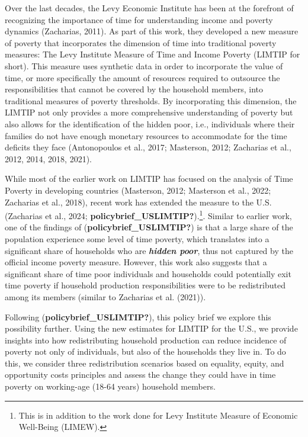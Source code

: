 \documentclass[
  11pt,
]{article}
\begin{document}
Over the last decades, the Levy Economic Institute has been at the
forefront of recognizing the importance of time for understanding income
and poverty dynamics (Zacharias, 2011). As part of this work, they
developed a new measure of poverty that incorporates the dimension of
time into traditional poverty measures: The Levy Institute Measure of
Time and Income Poverty (LIMTIP for short). This measure uses synthetic
data in order to incorporate the value of time, or more specifically the
amount of resources required to outsource the responsibilities that
cannot be covered by the household members, into traditional measures of
poverty thresholds. By incorporating this dimension, the LIMTIP not only
provides a more comprehensive understanding of poverty but also allows
for the identification of the hidden poor, i.e., individuals where their
families do not have enough monetary resources to accommodate for the
time deficits they face (Antonopoulos et al., 2017; Masterson, 2012;
Zacharias et al., 2012, 2014, 2018, 2021).

While most of the earlier work on LIMTIP has focused on the analysis of
Time Poverty in developing countries (Masterson, 2012; Masterson et al.,
2022; Zacharias et al., 2018), recent work has extended the measure to
the U.S. (Zacharias et al., 2024;
\textbf{policybrief\_USLIMTIP?}).\footnote{This is in addition to the
  work done for Levy Institute Measure of Economic Well-Being (LIMEW).}.
Similar to earlier work, one of the findings of
(\textbf{policybrief\_USLIMTIP?}) is that a large share of the
population experience some level of time poverty, which translates into
a significant share of households who are \textbf{\emph{hidden poor}},
thus not captured by the official income poverty measure. However, this
work also suggests that a significant share of time poor individuals and
households could potentially exit time poverty if household production
responsibilities were to be redistributed among its members (similar to
Zacharias et al. (2021)).

Following (\textbf{policybrief\_USLIMTIP?}), this policy brief we
explore this possibility further. Using the new estimates for LIMTIP for
the U.S., we provide insights into how redistributing household
production can reduce incidence of poverty not only of individuals, but
also of the households they live in. To do this, we consider three
redistribution scenarios based on equality, equity, and opportunity
costs principles and assess the change they could have in time poverty
on working-age (18-64 years) household members.
\end{document}
